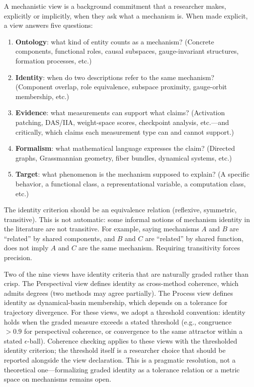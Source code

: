 \documentclass{article}
\begin{document}
A mechanistic view is a background commitment that a researcher makes,
explicitly or implicitly, when they ask what a mechanism is.  When made
explicit, a view answers five questions:

\begin{enumerate}[leftmargin=*, label=(\roman*)]
\item \textbf{Ontology}: what kind of entity counts as a mechanism?
      (Concrete components, functional roles, causal subspaces,
      gauge-invariant structures, formation processes, etc.)
\item \textbf{Identity}: when do two descriptions refer to the same
      mechanism?  (Component overlap, role equivalence, subspace
      proximity, gauge-orbit membership, etc.)
\item \textbf{Evidence}: what measurements can support what claims?
      (Activation patching, DAS/IIA, weight-space scores, checkpoint
      analysis, etc.---and critically, which claims each measurement
      type can and cannot support.)
\item \textbf{Formalism}: what mathematical language expresses the
      claim?  (Directed graphs, Grassmannian geometry, fiber bundles,
      dynamical systems, etc.)
\item \textbf{Target}: what phenomenon is the mechanism supposed to
      explain?  (A specific behavior, a functional class, a
      representational variable, a computation class, etc.)
\end{enumerate}

The identity criterion should be an equivalence relation (reflexive,
symmetric, transitive).  This is not automatic: some informal notions
of mechanism identity in the literature are not transitive.  For
example, saying mechanisms $A$ and $B$ are ``related'' by shared
components, and $B$ and $C$ are ``related'' by shared function, does
not imply $A$ and $C$ are the same mechanism.  Requiring transitivity
forces precision.

Two of the nine views have identity criteria that are naturally graded rather than crisp.  The Perspectival view defines identity as cross-method coherence, which admits degrees (two methods may agree partially).  The Process view defines identity as dynamical-basin membership, which depends on a tolerance for trajectory divergence.  For these views, we adopt a threshold convention: identity holds when the graded measure exceeds a stated threshold (e.g., congruence $> 0.9$ for perspectival coherence, or convergence to the same attractor within a stated $\epsilon$-ball).  Coherence checking applies to these views with the thresholded identity criterion; the threshold itself is a researcher choice that should be reported alongside the view declaration.  This is a pragmatic resolution, not a theoretical one---formalizing graded identity as a tolerance relation or a metric space on mechanisms remains open.
\end{document}
